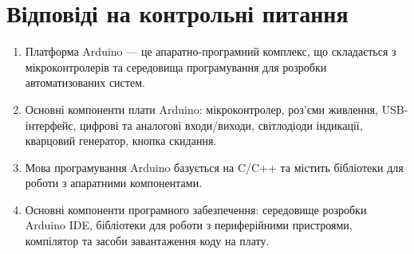 \documentclass[a4paper]{article}
\begin{document}
\section*{Відповіді на контрольні питання}
\begin{enumerate}
    \item Платформа Arduino — це апаратно-програмний комплекс, що складається з мікроконтролерів та середовища програмування для розробки автоматизованих систем.
    \item Основні компоненти плати Arduino: мікроконтролер, роз'єми живлення, USB-інтерфейс, цифрові та аналогові входи/виходи, світлодіоди індикації, кварцовий генератор, кнопка скидання.
    \item Мова програмування Arduino базується на C/C++ та містить бібліотеки для роботи з апаратними компонентами.
    \item Основні компоненти програмного забезпечення: середовище розробки Arduino IDE, бібліотеки для роботи з периферійними пристроями, компілятор та засоби завантаження коду на плату.
\end{enumerate}


    
\end{document}
